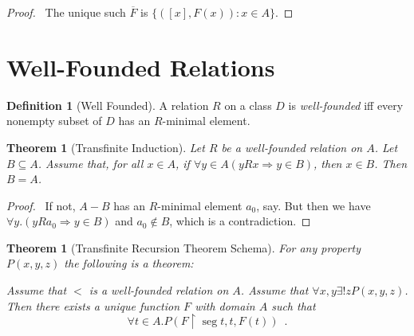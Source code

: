 \documentclass{report}
\let\qed\relax
\newtheorem{theorem}[axiom]{Theorem}
\theoremstyle{definition}
\newtheorem{definition}[axiom]{Definition}
\newcommand{\seg}{\ensuremath{\operatorname{seg}}}
\begin{document}
    \begin{proof}
        \pf\ The unique such $\overline{F}$ is $\{ ([x],F(x)) : x \in A \}$. \qed
    \end{proof}

    \section{Well-Founded Relations}

    \begin{definition}[Well Founded]
        A relation $R$ on a class $D$ is \emph{well-founded} iff every nonempty subset of $D$ has an
        $R$-minimal element.
    \end{definition}

    \begin{theorem}[Transfinite Induction]
        Let $R$ be a well-founded relation on $A$. Let $B \subseteq A$. Assume that, for all $x \in A$,
        if $\forall y \in A (yRx \Rightarrow y \in B)$, then $x \in B$. Then $B = A$.
    \end{theorem}

    \begin{proof}
        \pf\ If not, $A - B$ has an $R$-minimal element $a_0$, say. But then we have $\forall y. (y R a_0
        \Rightarrow y \in B)$ and $a_0 \notin B$, which is a contradiction. \qed
    \end{proof}

    \begin{theorem}[Transfinite Recursion Theorem Schema]
        For any property $P(x,y,z)$ the following is a theorem:

        Assume that $<$ is a well-founded relation on $A$. Assume that $\forall x,y \exists ! z P(x,y,z)$.
        Then there exists a unique function $F$ with domain $A$ such that
        \[ \forall t \in A. P(F \restriction \seg t, t, F(t)) \enspace . \]
    \end{theorem}
\end{document}
